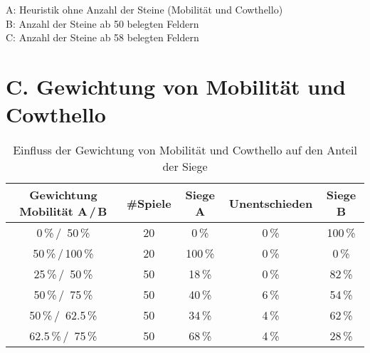 \small{
A: Heuristik ohne Anzahl der Steine (Mobilität und Cowthello) \\
B: Anzahl der Steine ab 50 belegten Feldern \\
C: Anzahl der Steine ab 58 belegten Feldern}

\pagebreak

\section*{C. Gewichtung von Mobilität und Cowthello}
 
\setcounter{table}{0}
\renewcommand{\thetable}{C\arabic{table}}

\begin{table}[hb]
\centering
\begin{tabular}{c|c|ccc}
\hline
Gewichtung Mobilität A\,/\,B & \#Spiele & Siege A & Unentschieden & Siege B \\
\hline
   0\,\%\,/\, 50\,\% & 20 &  0\,\% &  0\,\% &100\,\% \\
  50\,\%\,/\,100\,\% & 20 &100\,\% &  0\,\% &  0\,\% \\
  25\,\%\,/\, 50\,\% & 50 & 18\,\% &  0\,\% & 82\,\% \\
  50\,\%\,/\, 75\,\% & 50 & 40\,\% &  6\,\% & 54\,\% \\
  50\,\%\,/\, 62.5\,\% & 50 & 34\,\% &  4\,\% & 62\,\% \\
  62.5\,\%\,/\, 75\,\% & 50 & 68\,\% &  4\,\% & 28\,\% \\
\hline
\end{tabular}
\caption{Einfluss der Gewichtung von Mobilität und Cowthello auf den Anteil der Siege}
\label{table:combinedweighting}
\end{table}

\pagebreak

